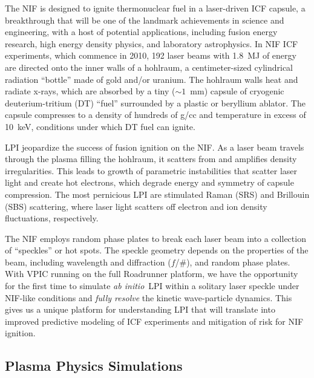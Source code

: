 \documentclass[10pt]{article}
\newcommand{\abinitio} {\textit{ab initio}}
\begin{document}
The NIF is designed to ignite thermonuclear fuel
in a laser-driven ICF capsule, a breakthrough that will be
one of the landmark achievements in science and engineering, with
a host of potential applications, including fusion energy
research, high energy density physics, and laboratory astrophysics.
In NIF ICF experiments, which commence in 2010, 192 laser beams with 
1.8~MJ of energy are directed onto the inner walls of a
hohlraum, a centimeter-sized cylindrical radiation ``bottle''
made of gold and/or uranium.  The hohlraum walls heat and radiate x-rays, 
which are absorbed by a tiny ($\sim 1$~mm) capsule of cryogenic 
deuterium-tritium (DT) ``fuel'' surrounded by a plastic or beryllium
ablator.  The capsule compresses to a density of hundreds
of g/cc and temperature in excess of 10~keV, conditions under which
DT fuel can ignite.

LPI jeopardize the success of fusion
ignition on the NIF.  As a laser beam travels through the plasma filling
the hohlraum, it scatters from and amplifies density irregularities.  
This leads to growth of parametric instabilities that
scatter laser light and create hot electrons, which degrade energy and 
symmetry of capsule compression.  The most pernicious LPI are stimulated
Raman (SRS) and Brillouin (SBS) scattering, where laser light scatters 
off electron and ion density fluctuations, respectively.

The NIF employs random phase plates to break each laser beam
into a collection of ``speckles'' or hot spots.  The
speckle geometry depends on the properties of the beam,
including wavelength and diffraction ($f$/\#), and random phase plates.  
With VPIC running on the full Roadrunner platform, we have the
opportunity for the first time to simulate \abinitio\ LPI within a
solitary laser speckle under NIF-like conditions and \textit{fully resolve} 
the kinetic wave-particle dynamics.  This gives us a
unique platform for understanding LPI that will translate into
improved predictive modeling of ICF experiments and mitigation of risk
for NIF ignition.

%
%
\subsection*{Plasma Physics Simulations}
\end{document}
